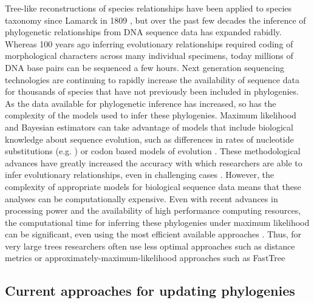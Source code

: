 \documentclass[10pt]{article}
\begin{document}
Tree-like reconstructions of species relationships have been applied to species taxonomy since Lamarck in 1809 \cite{Lamarck_philosophie_1873}, but over the past few decades the inference of phylogenetic relationships from DNA sequence data has expanded rabidly. 
Whereas 100 years ago inferring evolutionary relationships required coding of morphological characters across many individual specimens, today millions of DNA base pairs can be sequenced a few hours. 
Next generation sequencing technologies are continuing to rapidly increase the availability of sequence data for thousands of species that have not previously been included in phylogenies. 
As the data available for phylogenetic inference has increased, so has the complexity of the models used to infer these phylogenies. 
Maximum likelihood and Bayesian estimators can take advantage of models that include biological knowledge about sequence evolution, such as differences in rates of nucleotide substitutions (e.g. \cite{Jukes_evolution_1969}) or codon based models of evolution \cite{shapiro_choosing_2006}. 
These methodological advances have greatly increased the accuracy with which researchers are able to infer evolutionary relationships, even in challenging cases \cite{kuhner_simulation_1994}. 
However, the complexity of appropriate models for biological sequence data means that these analyses can be computationally expensive. 
Even with recent advances in processing power and the availability of high performance computing resources, the computational time for inferring these phylogenies under maximum likelihood can be significant, even using the most efficient available approaches \cite{stamatakis_RAxML-VI-HPC:_2006}.
Thus, for very large trees researchers often use less optimal approaches such as distance metrics or approximately-maximum-likelihood approaches such as FastTree \cite{price_fasttree:_2009, price_fasttree_2010}


\subsection*{Current approaches for updating phylogenies}
\end{document}
